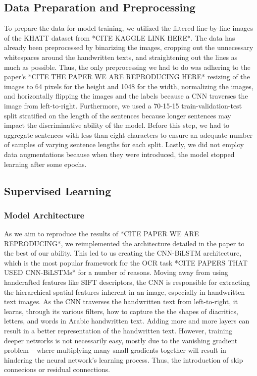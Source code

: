 \documentclass[conference]{IEEEtran}
\begin{document}
\subsection{Data Preparation and Preprocessing}
To prepare the data for model training, we utilized the filtered line-by-line images of the KHATT dataset from *CITE KAGGLE LINK HERE*. The data has already been preprocessed by binarizing the images, cropping out the unnecessary whitespaces around the handwritten texts, and straightening out the lines as much as possible. Thus, the only preprocessing we had to do was adhering to the paper's *CITE THE PAPER WE ARE REPRODUCING HERE* resizing of the images to 64 pixels for the height and 1048 for the width, normalizing the images, and horizontally flipping the images and the labels because a CNN traverses the image from left-to-right. Furthermore, we used a 70-15-15 train-validation-test split stratified on the length of the sentences because longer sentences may impact the discriminative ability of the model. Before this step, we had to aggregate sentences with less than eight characters to ensure an adequate number of samples of varying sentence lengths for each split. Lastly, we did not employ data augmentations because when they were introduced, the model stopped learning after some epochs.

\subsection{Supervised Learning}

\subsubsection{Model Architecture}

As we aim to reproduce the results of *CITE PAPER WE ARE REPRODUCING*, we reimplemented the architecture detailed in the paper to the best of our ability. This led to us creating the CNN-BiLSTM architecture, which is the most popular framework for the OCR task *CITE PAPERS THAT USED CNN-BiLSTMs* for a number of reasons. Moving away from using handcrafted features like SIFT descriptors, the CNN is responsible for extracting the hierarchical spatial features inherent in an image, especially in handwritten text images. As the CNN traverses the handwritten text from left-to-right, it learns, through its various filters, how to capture the the shapes of diacritics, letters, and words in Arabic handwritten text. Adding more and more layers can result in a better representation of the handwritten text. However, training deeper networks is not necessarily easy, mostly due to the vanishing gradient problem -- where multiplying many small gradients together will result in hindering the neural network's learning process. Thus, the introduction of skip connecions or residual connections.
\end{document}
